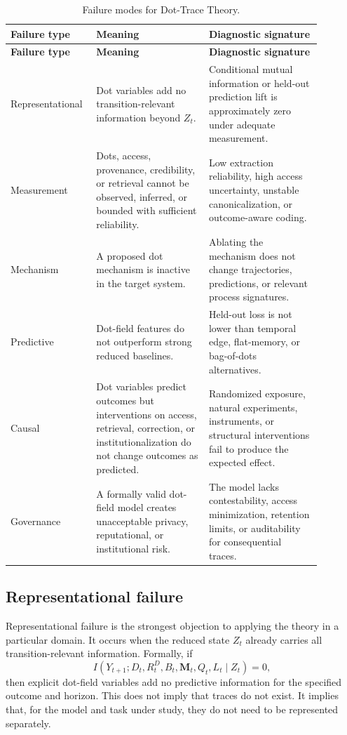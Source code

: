 \documentclass[11pt]{article}
\theoremstyle{remark}
\begin{document}
\begin{longtable}{L{0.20\linewidth}L{0.34\linewidth}L{0.34\linewidth}}
\caption{Failure modes for Dot-Trace Theory.}\label{tab:failure-modes}\\
\toprule
\textbf{Failure type} & \textbf{Meaning} & \textbf{Diagnostic signature}\\
\midrule
\endfirsthead
\toprule
\textbf{Failure type} & \textbf{Meaning} & \textbf{Diagnostic signature}\\
\midrule
\endhead
Representational & Dot variables add no transition-relevant information beyond $Z_t$. & Conditional mutual information or held-out prediction lift is approximately zero under adequate measurement.\\
Measurement & Dots, access, provenance, credibility, or retrieval cannot be observed, inferred, or bounded with sufficient reliability. & Low extraction reliability, high access uncertainty, unstable canonicalization, or outcome-aware coding.\\
Mechanism & A proposed dot mechanism is inactive in the target system. & Ablating the mechanism does not change trajectories, predictions, or relevant process signatures.\\
Predictive & Dot-field features do not outperform strong reduced baselines. & Held-out loss is not lower than temporal edge, flat-memory, or bag-of-dots alternatives.\\
Causal & Dot variables predict outcomes but interventions on access, retrieval, correction, or institutionalization do not change outcomes as predicted. & Randomized exposure, natural experiments, instruments, or structural interventions fail to produce the expected effect.\\
Governance & A formally valid dot-field model creates unacceptable privacy, reputational, or institutional risk. & The model lacks contestability, access minimization, retention limits, or auditability for consequential traces.\\
\bottomrule
\end{longtable}

\subsection{Representational failure}\label{representational-failure}

Representational failure is the strongest objection to applying the theory in a particular domain. It occurs when the reduced state $Z_t$ already carries all transition-relevant information. Formally, if
\[
I(Y_{t+1};D_t,R_t^D,B_t,\mathbf M_t,Q_t,L_t\mid Z_t)=0,
\]
then explicit dot-field variables add no predictive information for the specified outcome and horizon. This does not imply that traces do not exist. It implies that, for the model and task under study, they do not need to be represented separately.
\end{document}
